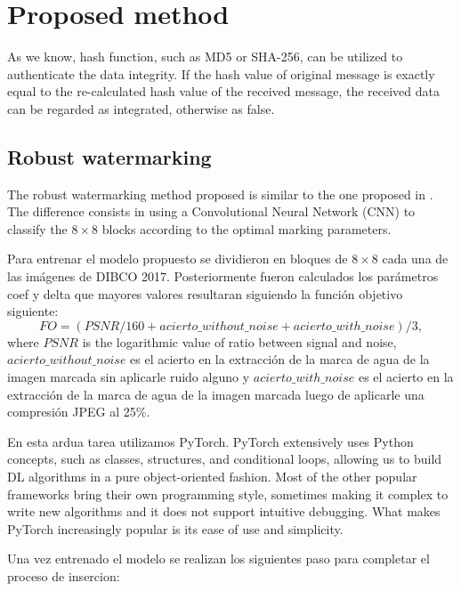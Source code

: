 \documentclass[runningheads]{llncs}
\begin{document}
\section{Proposed method}
As we know, hash function, such as MD5 or SHA-256, can be utilized to authenticate the data integrity. If the hash value of original message is exactly equal to the re-calculated hash value of the received message, the received data can be regarded as integrated, otherwise as false.

\subsection{Robust watermarking}
The robust watermarking method proposed is similar to the one proposed in \cite{avila2018watermarking}. The difference consists in using a Convolutional Neural Network (CNN) to classify the $8\times 8$ blocks according to the optimal marking parameters.

Para entrenar el modelo propuesto se dividieron en bloques de $8\times 8$ cada una de las imágenes de DIBCO 2017. Posteriormente fueron calculados los parámetros coef y delta que mayores valores resultaran siguiendo la función objetivo siguiente:
\begin{equation}
FO = (PSNR/160 + acierto{\_}without{\_}noise + acierto{\_}with{\_}noise)/3,
\label{FA}
\end{equation}
where $PSNR$ is the logarithmic value of ratio between signal and noise, 
$ acierto{\_}without{\_}noise $ es el acierto en la extracción de la marca de agua de la imagen marcada sin aplicarle ruido alguno y $ acierto{\_}with{\_}noise $ es el acierto en la extracción de la marca de agua de la imagen marcada luego de aplicarle una compresión JPEG al 25{\%}.

En esta ardua tarea utilizamos PyTorch. PyTorch extensively uses Python concepts, such as classes, structures, and conditional loops, allowing us to build DL algorithms in a pure object-oriented fashion. Most of the other popular frameworks bring their own programming style, sometimes making it
complex to write new algorithms and it does not support intuitive debugging. What makes PyTorch increasingly popular is its ease of use and simplicity. \cite{Subramanian2018}

Una vez entrenado el modelo se realizan los siguientes paso para completar el proceso de insercion:
\end{document}
